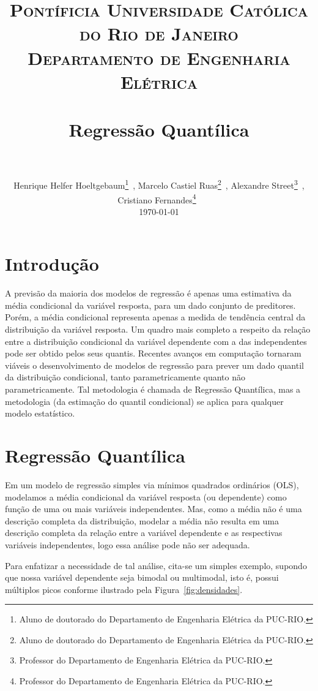 \documentclass[paper=a4, fontsize=11pt]{scrartcl}
\title{
		\usefont{OT1}{bch}{b}{n}
		\normalfont \normalsize \textsc{Pontíficia Universidade Católica do Rio de Janeiro \\ Departamento de Engenharia Elétrica} \\ 
		\horrule{0.5pt} \\[0.4cm]
		\huge Regressão Quantílica \\
		\horrule{2pt} \\[0.5cm]
}
\author{
		\normalfont 								\normalsize
        Henrique Helfer Hoeltgebaum\footnote{Aluno de doutorado do Departamento de Engenharia Elétrica da PUC-RIO.}~,
        Marcelo Castiel Ruas\footnote{Aluno de doutorado do Departamento de Engenharia Elétrica da PUC-RIO.}~,
         Alexandre Street\footnote{Professor do Departamento de Engenharia Elétrica da PUC-RIO.}~,\\ \normalfont 								\normalsize Cristiano Fernandes\footnote{Professor do Departamento de Engenharia Elétrica da PUC-RIO.}\ 
        \\[-1pt]		\normalsize
        \today}
\date{}
\numberwithin{equation}{section}		%
\numberwithin{figure}{section}			%
\numberwithin{table}{section}				%
\begin{document}
\maketitle
\section{Introdução}\label{intro}
A previsão da maioria dos modelos de regressão é apenas uma estimativa da média condicional da variável resposta, para um dado conjunto de preditores. Porém, a média condicional representa apenas a medida de tendência central da distribuição da variável resposta. Um quadro mais completo a respeito da relação entre a distribuição condicional da variável dependente com a das independentes pode ser obtido pelos seus quantis. Recentes avanços em computação tornaram viáveis o desenvolvimento de modelos de regressão para prever um dado quantil da distribuição condicional, tanto parametricamente quanto não parametricamente. Tal metodologia é chamada de Regressão Quantílica, mas a metodologia (da estimação do quantil condicional) se aplica para qualquer modelo estatístico.


\section{Regressão Quantílica}\label{regQuantilica}
Em um modelo de regressão simples via mínimos quadrados ordinários (OLS), modelamos a média condicional da variável resposta (ou dependente) como função de uma ou mais variáveis independentes. Mas, como a média não é uma descrição completa da distribuição, modelar a média não resulta em uma descrição completa da relação entre a variável dependente e as respectivas variáveis independentes, logo essa análise pode não ser adequada.

Para enfatizar a necessidade de tal análise, cita-se um simples exemplo, supondo que nossa variável dependente seja bimodal ou multimodal, isto é, possui múltiplos picos conforme ilustrado pela Figura~\ref{fig:densidades}.
\end{document}
